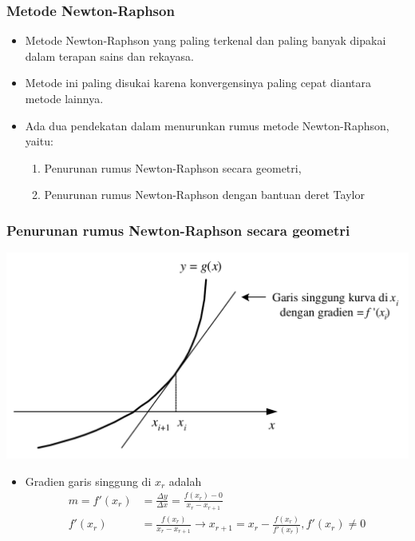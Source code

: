 \documentclass[pdflatex,compress]{beamer}
\begin{document}
\begin{frame}
	\frametitle{Metode Newton-Raphson}
	\begin{itemize}
		\item Metode Newton-Raphson yang paling terkenal dan paling banyak dipakai dalam terapan sains dan rekayasa.
		\item Metode ini paling disukai karena konvergensinya paling cepat diantara metode lainnya.
		\item Ada dua pendekatan dalam menurunkan rumus metode Newton-Raphson, yaitu:
		\begin{enumerate}
			\item Penurunan rumus Newton-Raphson secara geometri,
			\item Penurunan rumus Newton-Raphson dengan bantuan deret Taylor
		\end{enumerate}
	\end{itemize}
\end{frame}

\begin{frame}
	\frametitle{Penurunan rumus Newton-Raphson secara geometri}
	\begin{center}
		\includegraphics[width=0.6\linewidth]{img/img15}
	\end{center}
	\begin{itemize}
		\item Gradien garis singgung di $ x_r $ adalah
		\begin{align*}
			m = f'(x_r) &= \frac{\Delta y}{\Delta x} = \frac{f(x_r)-0}{x_r - x_{r+1}} \\
			f'(x_r) &= \frac{f(x_r)}{x_r - x_{r+1}} \rightarrow x_{r+1} = x_r - \frac{f(x_r)}{f'(x_r)}, f'(x_r) \neq 0
		\end{align*}
	\end{itemize}
\end{frame}
\end{document}
